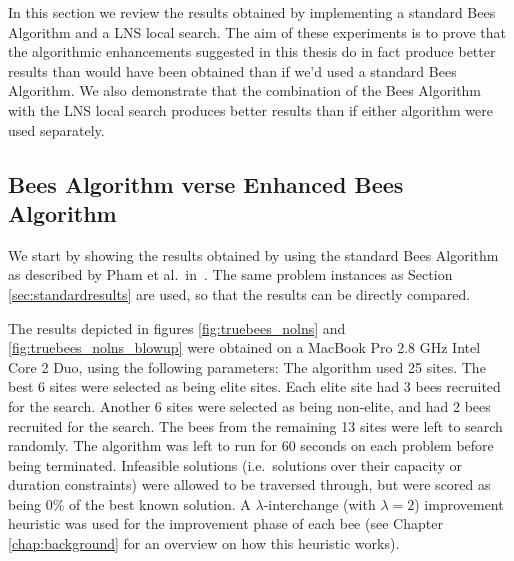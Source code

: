 In this section we review the results obtained by implementing a standard Bees Algorithm and a LNS local search. The aim of these experiments is to prove that the algorithmic enhancements suggested in this thesis do in fact produce better results than would have been obtained than if we'd used a standard Bees Algorithm. We also demonstrate that the combination of the Bees Algorithm with the LNS local search produces better results than if either algorithm were used separately.

\subsection{Bees Algorithm verse Enhanced Bees Algorithm}
\label{subsec:bavebs}

We start by showing the results obtained by using the standard Bees Algorithm as described by Pham et al.~in~\cite{PGKORZ:2005}. The same problem instances as Section \ref{sec:standardresults} are used, so that the results can be directly compared.



The results depicted in figures \ref{fig:truebees_nolns} and \ref{fig:truebees_nolns_blowup} were obtained on a MacBook Pro 2.8 GHz Intel Core 2 Duo, using the following parameters: The algorithm used 25 sites. The best 6 sites were selected as being elite sites. Each elite site had 3 bees recruited for the search. Another 6 sites were selected as being non-elite, and had 2 bees recruited for the search. The bees from the remaining 13 sites were left to search randomly. The algorithm was left to run for 60 seconds on each problem before being terminated. Infeasible solutions (i.e.~solutions over their capacity or duration constraints) were allowed to be traversed through, but were scored as being 0\% of the best known solution. A $\lambda$-interchange (with $\lambda = 2$) improvement heuristic was used for the improvement phase of each bee (see Chapter \ref{chap:background} for an overview on how this heuristic works).

